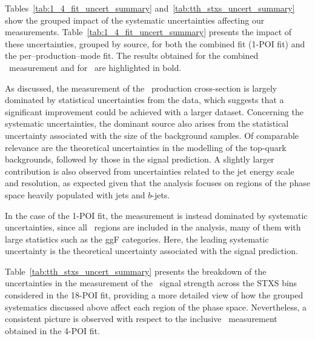 Tables~\ref{tab:1_4_fit_uncert_summary} and~\ref{tab:tth_stxs_uncert_summary} show the grouped impact of the systematic uncertainties affecting our measurements. 
Table~\ref{tab:1_4_fit_uncert_summary} presents the impact of these uncertainties, grouped by source, for both the combined fit (1-POI fit) and the per–production–mode fit. 
The results obtained for the combined \htautau\ measurement and for \ttHtt\ are highlighted in bold. 

As discussed, the measurement of the \ttH\ production cross-section is largely dominated by statistical uncertainties from the data, 
which suggests that a significant improvement could be achieved with a larger dataset. 
Concerning the systematic uncertainties, the dominant source also arises from the statistical uncertainty associated with the size of the background samples. 
Of comparable relevance are the theoretical uncertainties in the modelling of the top-quark backgrounds, followed by those in the signal prediction. 
A slightly larger contribution is also observed from uncertainties related to the jet energy scale and resolution, as expected given that the analysis focuses on regions of the phase space heavily populated with jets and $b$-jets. 

In the case of the 1-POI fit, the measurement is instead dominated by systematic uncertainties, 
since all \htautau\ regions are included in the analysis, many of them with large statistics such as the ggF categories. 
Here, the leading systematic uncertainty is the theoretical uncertainty associated with the signal prediction.

Table~\ref{tab:tth_stxs_uncert_summary} presents the breakdown of the uncertainties in the measurement of the \ttH\ signal strength across the STXS bins considered in the 18-POI fit, 
providing a more detailed view of how the grouped systematics discussed above affect each region of the phase space. 
Nevertheless, a consistent picture is observed with respect to the inclusive \ttH\ measurement obtained in the 4-POI fit.

